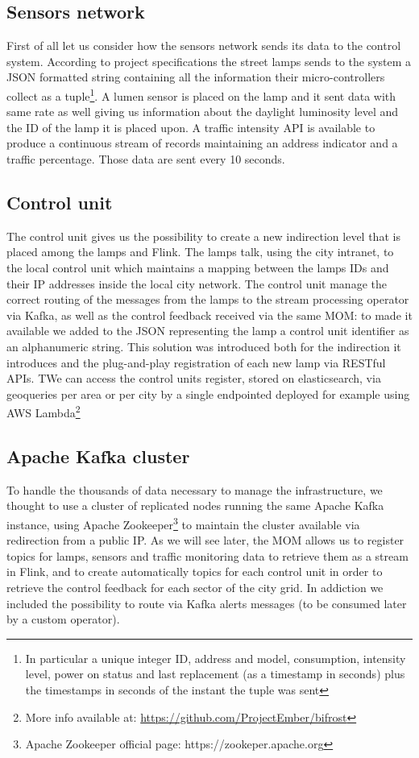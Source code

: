 \subsection{Sensors network}
First of all let us consider how the sensors network sends its data to the control system. According to project specifications the street lamps sends to the system a JSON formatted string containing all the information their micro-controllers collect as a tuple\footnote{In particular a unique integer ID, address and model, consumption, intensity level, power on status and last replacement (as a timestamp in seconds) plus the timestamps in seconds of the instant the tuple was sent}. A lumen sensor is placed on the lamp and it sent data with same rate as well giving us information about the daylight luminosity level and the ID of the lamp it is placed upon. A traffic intensity API is available to produce a continuous stream of records maintaining an address indicator and a traffic percentage. Those data are sent every 10 seconds.

\subsection{Control unit}
The control unit gives us the possibility to create a new indirection level that is placed among the lamps and Flink. The lamps talk, using the city intranet, to the local control unit which maintains a mapping between the lamps IDs and their IP addresses inside the local city network. The control unit manage the correct routing of the messages from the lamps to the stream processing operator via Kafka, as well as the control feedback received via the same MOM: to made it available we added to the JSON representing the lamp a control unit identifier as an alphanumeric string. This solution was introduced both for the indirection it introduces and the plug-and-play registration of each new lamp via RESTful APIs. TWe can access the control units register, stored on elasticsearch, via geoqueries per area or per city by a single endpointed deployed for example using AWS Lambda\footnote{More info available at: \url{https://github.com/ProjectEmber/bifrost}}

\subsection{Apache Kafka cluster}
To handle the thousands of data necessary to manage the infrastructure, we thought to use a cluster of replicated nodes running the same Apache Kafka instance, using Apache Zookeeper\footnote{Apache Zookeeper official page: https://zookeper.apache.org} to maintain the cluster available via redirection from a public IP. As we will see later, the MOM allows us to register topics for lamps, sensors and traffic monitoring data to retrieve them as a stream in Flink, and to create automatically topics for each control unit in order to retrieve the control feedback for each sector of the city grid. In addiction we included the possibility to route via Kafka alerts messages (to be consumed later by a custom operator).

